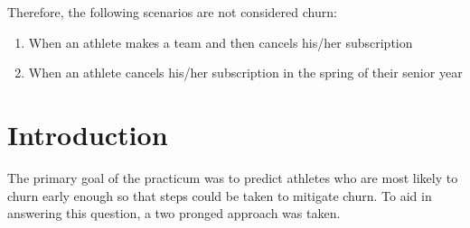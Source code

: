 \documentclass[
10pt, %
a4paper, %
oneside, %
headinclude,footinclude, %
BCOR5mm, %
]{scrartcl}
\begin{document}
Therefore, the following scenarios are not considered churn:

\begin{enumerate}[noitemsep] %
\item When an athlete makes a team and then cancels his/her subscription
\item When an athlete cancels his/her subscription in the spring of their senior year
\end{enumerate}





{\let\thefootnote\relax{}}

{\let\thefootnote\relax{}}


\newpage %


\section{Introduction}


The primary goal of the practicum was to predict athletes who are most likely to churn early enough so that steps could be taken to mitigate churn. To aid in answering this question, a two pronged approach was taken. 
\end{document}
